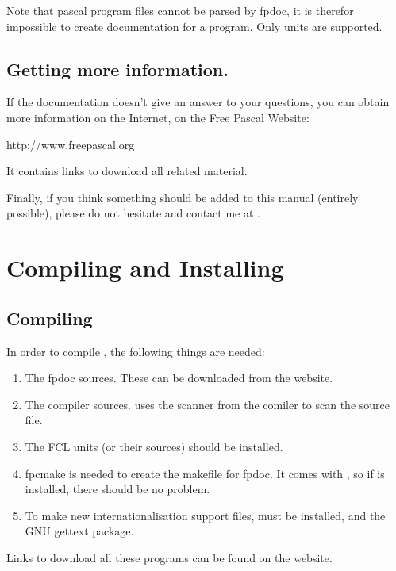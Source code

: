 Note that pascal program files cannot be parsed by fpdoc, it is therefor 
impossible to create documentation for a program. Only units are supported.

\section{Getting more information.}
If the documentation doesn't give an answer to your questions,
you can obtain more information on the Internet, on the Free Pascal Website: 

{http://www.freepascal.org} 

It contains links to download all \fpdoc related material.

Finally, if you think something should be added to this manual
(entirely possible), please do not hesitate and contact me at
.

\chapter{Compiling and Installing \fpdoc}
\label{ch:Installation}

\section{Compiling}
In order to compile \fpdoc, the following things are needed:
\begin{enumerate}
\item The fpdoc sources. These can be downloaded from the \fpdoc website.
\item The \fpc compiler sources. \fpdoc uses the scanner from the \fpc
comiler to scan the source file.
\item The FCL units (or their sources) should be installed. 
\item fpcmake is needed to create the makefile for fpdoc. It comes with
\fpc, so if \fpc is installed, there should be no problem.
\item To make new internationalisation support files,  must be
installed, and the GNU gettext package.
\end{enumerate}
Links to download all these programs can be found on the \fpdoc website.

